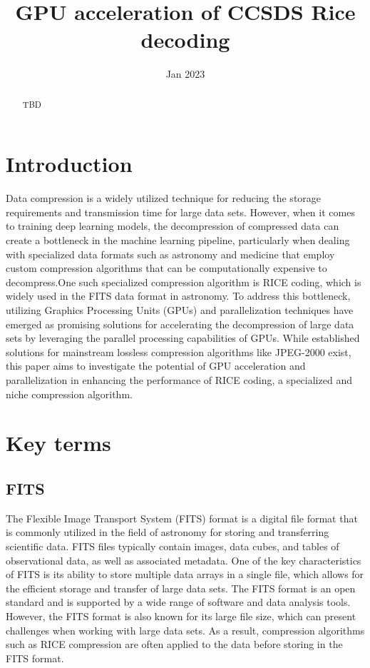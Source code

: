 \documentclass[licencjacka,en]{pracamgr}
\title{GPU acceleration of CCSDS Rice decoding}
\date{Jan 2023}
\begin{document}
\maketitle

\begin{abstract}
    TBD
\end{abstract}

\tableofcontents

\chapter*{Introduction}
Data compression is a widely utilized technique for reducing the storage requirements and 
transmission time for large data sets. However, when it comes to training deep learning models, 
the decompression of compressed data can create a bottleneck in the machine learning pipeline, particularly
when dealing with specialized data formats such as astronomy and medicine that employ custom compression 
algorithms that can be computationally expensive to decompress.One such specialized compression algorithm is RICE coding,
which is widely used in the FITS data format in astronomy. To address this bottleneck, 
utilizing Graphics Processing Units (GPUs) and parallelization techniques have emerged as promising solutions
for accelerating the decompression of large data sets by leveraging the parallel processing capabilities of GPUs. 
While established solutions for mainstream lossless compression algorithms like JPEG-2000 exist, 
this paper aims to investigate the potential of GPU acceleration and parallelization
in enhancing the performance of RICE coding, a specialized and niche compression algorithm.


\chapter{Key terms}\label{r:pojecia}

\section{FITS}
The Flexible Image Transport System (FITS) format is a digital file format that is commonly
 utilized in the field of astronomy for storing and transferring scientific data. FITS files 
 typically contain images, data cubes, and tables of observational data, as well as associated metadata. 
 One of the key characteristics of FITS is its ability to store multiple data arrays in a single file, which 
 allows for the efficient storage and transfer of large data sets. The FITS format is an open standard 
 and is supported by a wide range of software and data analysis tools. However, the FITS format is also 
 known for its large file size, which can present challenges when working with large data sets.
  As a result, compression algorithms such as RICE compression are often applied to the data before storing in the FITS format.
\end{document}
